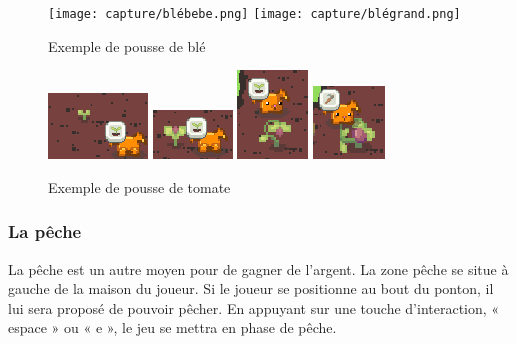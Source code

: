 \documentclass{article}
\begin{document}
        \begin{figure}[h]
            \centering
            \texttt{[image: capture/blébebe.png]}
            \texttt{[image: capture/blégrand.png]} 
            \caption{Exemple de pousse de blé}
        \end{figure}
        \begin{figure}[h]
            \centering
            \includegraphics{capture/tomateGraine.png}
            \includegraphics{capture/TomateMoyen.png}
            \includegraphics{capture/toamteAdulte.png}
            \includegraphics{capture/tomateFini.png}
            \caption{Exemple de pousse de tomate}
            \label{fig:enter-label}
        \end{figure}

        \newpage
        
        \subsubsection{La pêche}
        La pêche est un autre moyen pour de gagner de l'argent. La zone pêche se situe à gauche de la maison du joueur. Si le joueur se positionne au bout du ponton, il lui sera proposé de pouvoir pêcher. En appuyant sur une touche d'interaction, « espace » ou « e », le jeu se mettra en phase de pêche.
\end{document}
